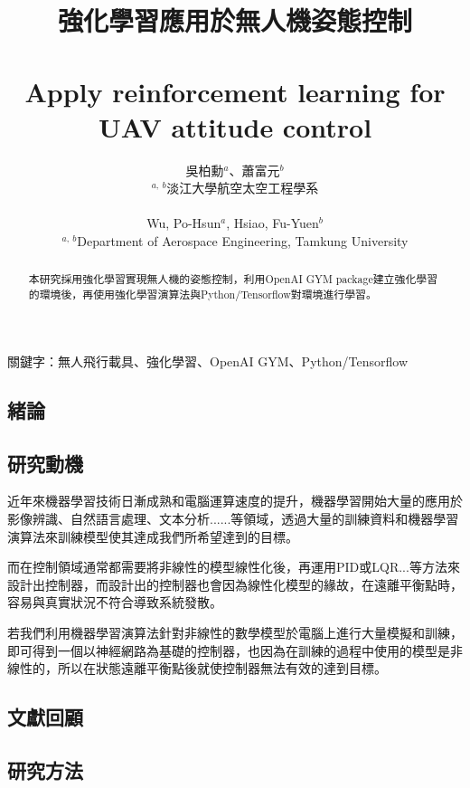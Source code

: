 \documentclass[a4paper, onecolumn, 11pt, AutoFakeBold]{article}
\title{\textfourteen
    \textbf{強化學習應用於無人機姿態控制}\\
    \ \\
    \textbf{Apply reinforcement learning for UAV attitude control}
}
\author{\texttwelve
    吳柏勳$^{a}$、蕭富元$^{b}$\\
    $^{a,\ b}$淡江大學航空太空工程學系\\
    \ \\
    Wu, Po-Hsun$^{a}$, Hsiao, Fu-Yuen$^{b}$\\
    $^{a,\ b}$Department of Aerospace Engineering, Tamkung University
}
\date{}
\newcommand{\textpt}[1]{\fontsize{#1}{#1}\selectfont}
\begin{document}
\maketitle
\thispagestyle{fancy}

\begin{abstract} \textpt{11}
本研究採用強化學習實現無人機的姿態控制，利用OpenAI GYM package建立強化學習的環境後，再使用強化學習演算法與Python/Tensorflow對環境進行學習。
\end{abstract}
\bigskip

關鍵字：無人飛行載具、強化學習、OpenAI GYM、Python/Tensorflow
\bigskip

\begin{multicols*}{2}

\section{緒論}
\subsection{研究動機}
\par
近年來機器學習技術日漸成熟和電腦運算速度的提升，機器學習開始大量的應用於影像辨識、自然語言處理、文本分析......等領域，透過大量的訓練資料和機器學習演算法來訓練模型使其達成我們所希望達到的目標。
\par
而在控制領域通常都需要將非線性的模型線性化後，再運用PID或LQR...等方法來設計出控制器，而設計出的控制器也會因為線性化模型的緣故，在遠離平衡點時，容易與真實狀況不符合導致系統發散。
\par
若我們利用機器學習演算法針對非線性的數學模型於電腦上進行大量模擬和訓練，即可得到一個以神經網路為基礎的控制器，也因為在訓練的過程中使用的模型是非線性的，所以在狀態遠離平衡點後就使控制器無法有效的達到目標。

\bigskip
\subsection{文獻回顧}
\cite{Flight_Controller_Synthesis_Via_Deep_Reinforcement_Learning}
\cite{Reinforcement_Learning_for_UAV_Attitude_Control}

\bigskip
\subsection{研究方法}


\end{multicols*}
\end{document}
